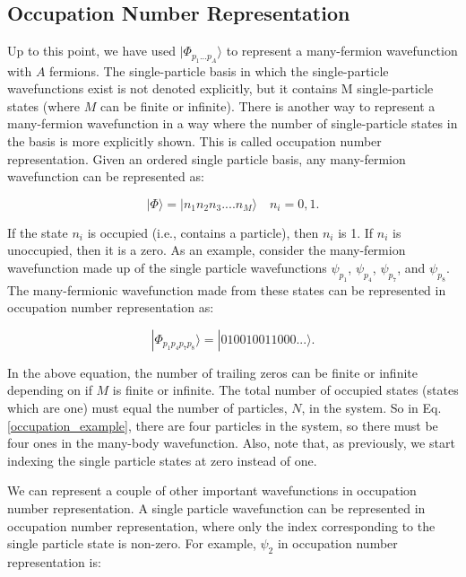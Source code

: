 \subsection*{Occupation Number Representation}

Up to this point, we have used $|\Phi_{p_1...p_A}\rangle$ to represent a many-fermion wavefunction with $A$ fermions. The single-particle basis in which the single-particle wavefunctions exist is not denoted explicitly, but it contains M single-particle states (where $M$ can be finite or infinite). There is another way to represent a many-fermion wavefunction in a way where the number of single-particle states in the basis is more explicitly shown. This is called occupation number representation. Given an ordered single particle basis, any many-fermion wavefunction can be represented as:

\begin{equation}
	|\Phi\rangle = |n_1 n_2 n_3 .... n_M \rangle \quad n_i = 0,1.
\end{equation}

If the state $n_i$ is occupied (i.e., contains a particle), then $n_i$ is 1. If $n_i$ is unoccupied, then it is a zero. As an example, consider the many-fermion wavefunction made up of the single particle wavefunctions $\psi_{p_1}$, $\psi_{p_4}$, $\psi_{p_7}$, and $\psi_{p_8}$. The many-fermionic wavefunction made from these states can be represented in occupation number representation as:

\begin{equation} \label{occupation_example}
	|\Phi_{p_1p_4p_7p_8} \rangle = |010010011000...\rangle.
\end{equation}

In the above equation, the number of trailing zeros can be finite or infinite depending on if $M$ is finite or infinite. The total number of occupied states (states which are one) must equal the number of particles, $N$, in the system. So in Eq. \ref{occupation_example}, there are four particles in the system, so there must be four ones in the many-body wavefunction. Also, note that, as previously, we start indexing the single particle states at zero instead of one.

We can represent a couple of other important wavefunctions in occupation number representation. A single particle wavefunction can be represented in occupation number representation, where only the index corresponding to the single particle state is non-zero. For example, $\psi_2$ in occupation number representation is:


